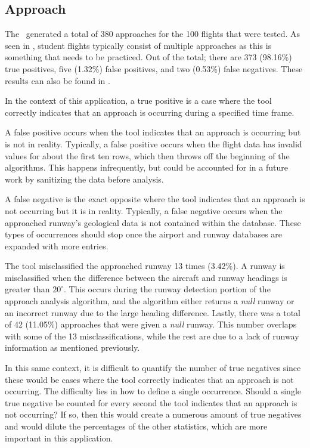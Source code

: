     
    \subsection{Approach}
    
        The \toolname\ generated a total of 380 approaches for the 100 flights that were tested. As seen in , student flights typically consist of multiple approaches as this is something that needs to be practiced.  Out of the total; there are 373 (98.16\%) true positives, five (1.32\%) false positives, and two (0.53\%) false negatives.  These results can also be found in .
        
        In the context of this application, a true positive is a case where the tool correctly indicates that an approach is occurring during a specified time frame.
        
        A false positive occurs when the tool indicates that an approach is occurring but is not in reality.  Typically, a false positive occurs when the flight data has invalid values for about the first ten rows, which then throws off the beginning of the algorithms.  This happens infrequently, but could be accounted for in a future work by sanitizing the data before analysis.
        
        A false negative is the exact opposite where the tool indicates that an approach is not occurring but it is in reality.  Typically, a false negative occurs when the approached runway's geological data is not contained within the database.  These types of occurrences should stop once the airport and runway databases are expanded with more entries.
        
        The tool misclassified the approached runway 13 times (3.42\%).  A runway is misclassified when the difference between the aircraft and runway headings is greater than $20^\circ$.  This occurs during the runway detection portion of the approach analysis algorithm, and the algorithm either returns a \emph{null} runway or an incorrect runway due to the large heading difference.  Lastly, there was a total of 42 (11.05\%) approaches that were given a \textit{null} runway.  This number overlaps with some of the 13 misclassifications, while the rest are due to a lack of runway information as mentioned previously.

        In this same context, it is difficult to quantify the number of true negatives since these would be cases where the tool correctly indicates that an approach is not occurring.  The difficulty lies in how to define a single occurrence.  Should a single true negative be counted for every second the tool indicates that an approach is not occurring?  If so, then this would create a numerous amount of true negatives and would dilute the percentages of the other statistics, which are more important in this application.


